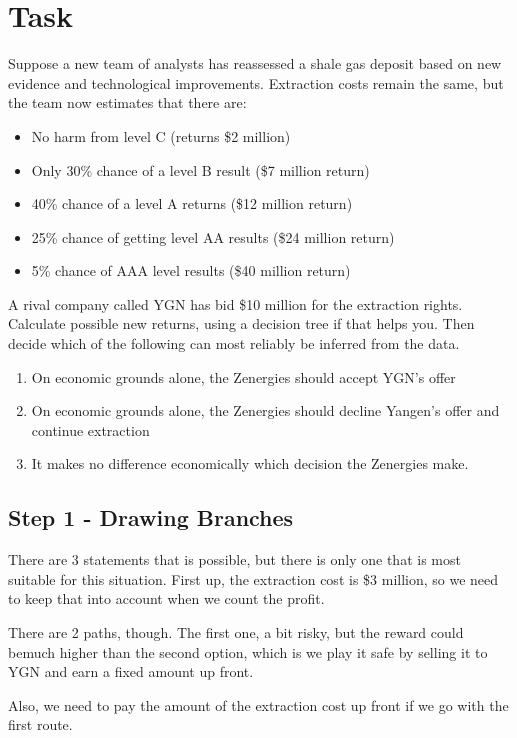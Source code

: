 \documentclass[12pt,titlepage]{article}
\begin{document}
\section{Task}
Suppose a new team of analysts has reassessed a shale gas deposit based on new evidence and technological improvements. Extraction costs remain the same, but the team now estimates that there are:
\begin{itemize}
    \item No harm from level C (returns \$2 million)
    \item Only 30\% chance of a level B result (\$7 million return)
    \item 40\% chance of a level A returns (\$12 million return)
    \item 25\% chance of getting level AA results (\$24 million return)
    \item 5\% chance of AAA level results (\$40 million return)
\end{itemize}
A rival company called YGN has bid \$10 million for the extraction rights.
Calculate possible new returns, using a decision tree if that helps you. Then decide which of the following can most reliably be inferred from the data.
\begin{enumerate}[label=\Alph*.)]
    \item On economic grounds alone, the Zenergies should accept YGN's offer
    \item On economic grounds alone, the Zenergies should decline Yangen's offer and continue extraction
    \item It makes no difference economically which decision the Zenergies make.
\end{enumerate}

\pagebreak

\subsection*{Step 1 - Drawing Branches}

There are 3 statements that is possible, but there is only one that is most suitable for this situation.
First up, the extraction cost is \$3 million, so we need to keep that into account when we count the profit.

There are 2 paths, though. The first one, a bit risky, but the reward could bemuch higher than the second option,
which is we play it safe by selling it to YGN and earn a fixed amount up front.

Also, we need to pay the amount of the extraction cost up front if we go with the first route.
\end{document}
